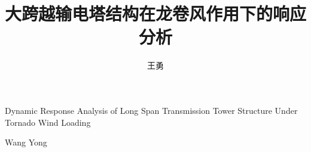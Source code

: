 \documentclass[algorithmlist,figurelist,tablelist,nomlist,masters]{seuthesix}
\begin{document}
\title{大跨越输电塔结构在龙卷风作用下的响应分析}{}{Dynamic Response Analysis of Long Span Transmission Tower Structure Under Tornado Wind Loading}{}
\author{王勇}{Wang Yong}
\authorizedate{\today}
\committeechair{}
\reviewer{}{}

\makebigcover
\makecover

\begin{abstract}{}
\end{abstract}

\begin{englishabstract}{}
\end{englishabstract}

\tableofcontents

\mainmatter








\appendix


\end{document}
